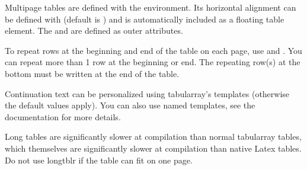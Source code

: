 Multipage tables are defined with the  environment. Its horizontal alignment can be defined with  (default is ) and is automatically included as a floating table element. The  and  are defined as outer attributes. 

To repeat rows at the beginning and end of the table on each page, use  and . You can repeat more than 1 row at the beginning or end. The repeating row(s) at the bottom must be written at the end of the table.

Continuation text can be personalized using tabularray's  templates (otherwise the default values apply). You can also use named templates, see the documentation for more details. 

Long tables are significantly slower at compilation than normal tabularray tables, which themselves are significantly slower at compilation than native Latex tables. Do not use longtblr if the table can fit on one page.

